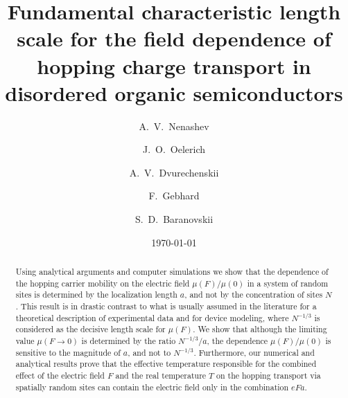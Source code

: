 \documentclass[aps,reprint,amsmath,amssymb,superscriptaddress,showpacs,prb]{revtex4-1}
\begin{document}
\title{Fundamental characteristic length scale for the field dependence of hopping charge transport
in disordered organic semiconductors}

\author{A.~V.~Nenashev}

\author {J.~O.~Oelerich}

\author{A.~V.~Dvurechenskii}

\author{F.~Gebhard}

\author {S.~D.~Baranovskii}


\date{\today}

\begin{abstract}
	Using analytical arguments and computer simulations we show that the dependence of the hopping carrier mobility on the electric field $\mu(F)/\mu(0)$ in a system of random sites is determined by the localization length $a$, and not by the concentration of sites $N$. This result is in drastic contrast to what is usually assumed in the literature for a theoretical description of experimental data and for device modeling, where $N^{-1/3}$ is considered as the decisive length scale for $\mu(F)$. We show that although the limiting value $\mu(F \rightarrow 0)$ is determined by the ratio $N^{-1/3}/a$, the dependence $\mu(F)/\mu(0)$ is sensitive to the magnitude of $a$, and not to $N^{-1/3}$. Furthermore, our numerical and analytical results prove that the effective temperature responsible for the combined effect of the electric field $F$ and the real temperature $T$ on the hopping transport via spatially random sites can contain the electric field only in the combination $eFa$.
\end{abstract}


\maketitle
\end{document}
